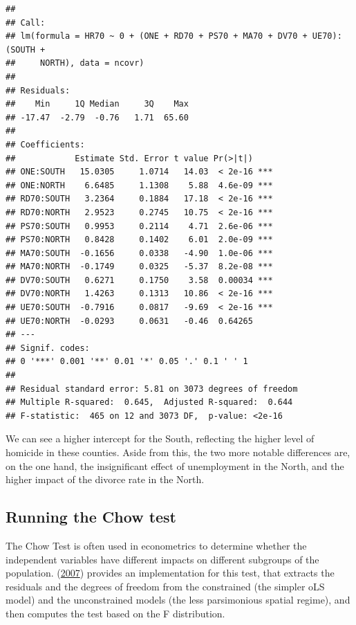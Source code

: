 \documentclass[
  krantz2]{krantz}
\begin{document}
\begin{verbatim}
## 
## Call:
## lm(formula = HR70 ~ 0 + (ONE + RD70 + PS70 + MA70 + DV70 + UE70):(SOUTH + 
##     NORTH), data = ncovr)
## 
## Residuals:
##    Min     1Q Median     3Q    Max 
## -17.47  -2.79  -0.76   1.71  65.60 
## 
## Coefficients:
##            Estimate Std. Error t value Pr(>|t|)    
## ONE:SOUTH   15.0305     1.0714   14.03  < 2e-16 ***
## ONE:NORTH    6.6485     1.1308    5.88  4.6e-09 ***
## RD70:SOUTH   3.2364     0.1884   17.18  < 2e-16 ***
## RD70:NORTH   2.9523     0.2745   10.75  < 2e-16 ***
## PS70:SOUTH   0.9953     0.2114    4.71  2.6e-06 ***
## PS70:NORTH   0.8428     0.1402    6.01  2.0e-09 ***
## MA70:SOUTH  -0.1656     0.0338   -4.90  1.0e-06 ***
## MA70:NORTH  -0.1749     0.0325   -5.37  8.2e-08 ***
## DV70:SOUTH   0.6271     0.1750    3.58  0.00034 ***
## DV70:NORTH   1.4263     0.1313   10.86  < 2e-16 ***
## UE70:SOUTH  -0.7916     0.0817   -9.69  < 2e-16 ***
## UE70:NORTH  -0.0293     0.0631   -0.46  0.64265    
## ---
## Signif. codes:  
## 0 '***' 0.001 '**' 0.01 '*' 0.05 '.' 0.1 ' ' 1
## 
## Residual standard error: 5.81 on 3073 degrees of freedom
## Multiple R-squared:  0.645,  Adjusted R-squared:  0.644 
## F-statistic:  465 on 12 and 3073 DF,  p-value: <2e-16
\end{verbatim}

We can see a higher intercept for the South, reflecting the higher level of homicide in these counties. Aside from this, the two more notable differences are, on the one hand, the insignificant effect of unemployment in the North, and the higher impact of the divorce rate in the North.

\hypertarget{running-the-chow-test}{%
\subsection{Running the Chow test}\label{running-the-chow-test}}

The Chow Test is often used in econometrics to determine whether the independent variables have different impacts on different subgroups of the population. (\protect\hyperlink{ref-Anselin_2007}{2007}) provides an implementation for this test, that extracts the residuals and the degrees of freedom from the constrained (the simpler oLS model) and the unconstrained models (the less parsimonious spatial regime), and then computes the test based on the F distribution.
\end{document}
